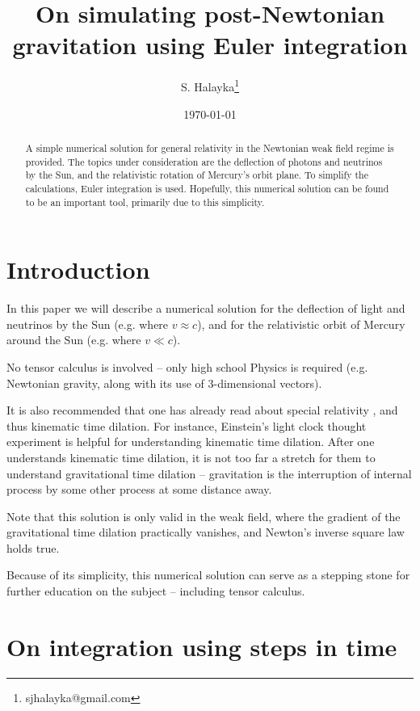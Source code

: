 \documentclass[12pt]{article}
\title{On simulating post-Newtonian gravitation using Euler integration}
\author{S. Halayka\footnote{sjhalayka@gmail.com}}
\date{\today\;\currenttime}
\begin{document}
 
\maketitle

\begin{abstract}
A simple numerical solution for general relativity in the Newtonian weak field regime is provided.
The topics under consideration are the deflection of photons and neutrinos by the Sun, and the relativistic rotation of Mercury's orbit plane.
To simplify the calculations, Euler integration is used.
Hopefully, this numerical solution can be found to be an important tool, primarily due to this simplicity.
\end{abstract}


\section{Introduction}

In this paper we will describe a numerical solution for the deflection of light and neutrinos by the Sun (e.g. where $v \approx c$), and for the relativistic orbit of Mercury around the Sun (e.g. where $v \ll c$).

No tensor calculus is involved -- only high school Physics is required (e.g. Newtonian gravity, along with its use of 3-dimensional vectors).

It is also recommended that one has already read about special relativity \cite{einstein, morin}, and thus kinematic time dilation.
For instance, Einstein's light clock thought experiment is helpful for understanding kinematic time dilation.
After one understands kinematic time dilation, it is not too far a stretch for them to understand gravitational time dilation -- gravitation is the interruption of internal process by some other process at some distance away.

Note that this solution is only valid in the weak field, where the gradient of the gravitational time dilation practically vanishes, and Newton's inverse square law holds true.

Because of its simplicity, this numerical solution can serve as a stepping stone for further education on the subject -- including tensor calculus.







\section{On integration using steps in time}
\end{document}
